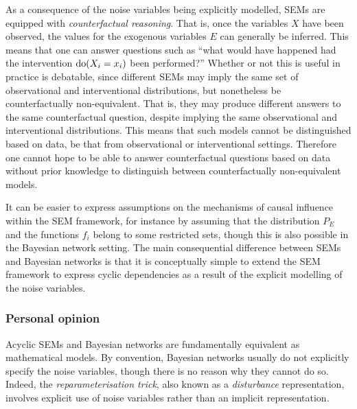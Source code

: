 As a consequence of the noise variables being explicitly modelled, SEMs are equipped with \emph{counterfactual reasoning}. 
That is, once the variables $X$ have been observed, the values for the exogenous variables $E$ can generally be inferred. 
This means that one can answer questions such as ``what would have happened had the intervention $\operatorname{do}(X_i=x_i)$ been performed?''
Whether or not this is useful in practice is debatable, since different SEMs may imply the same set of observational and interventional distributions, but nonetheless be counterfactually non-equivalent. That is, they may produce different answers to the same counterfactual question, despite implying the same observational and interventional distributions. This means that such models cannot be distinguished based on data, be that from observational or interventional settings. Therefore one cannot hope to be able to answer counterfactual questions based 
on data without prior knowledge to distinguish between counterfactually non-equivalent models.

It can be easier to express assumptions on the mechanisms of causal influence within the SEM framework, for instance by assuming that the distribution $P_E$ and the functions $f_i$ belong to some restricted sets, though this is also possible in the Bayesian network setting.
The main consequential difference between SEMs and Bayesian networks is that it is conceptually simple to extend the SEM framework to express cyclic dependencies as a result of the explicit modelling of the noise variables.



\subsubsection{Personal opinion}

Acyclic SEMs and Bayesian networks are fundamentally equivalent as mathematical models.
By convention, Bayesian networks usually do not explicitly specify the noise variables, though there is no reason why they cannot do so.
Indeed, the \emph{reparameterisation trick}, also known as a \emph{disturbance} representation, involves explicit use of noise variables rather than an implicit representation.

